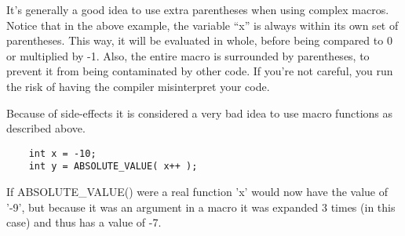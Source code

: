 It's generally a good idea to use extra parentheses when using complex macros. Notice that in the above example, the variable ``x'' is always within its own set of parentheses. This way, it will be evaluated in whole, before being compared to 0 or multiplied by -1. Also, the entire macro is surrounded by parentheses, to prevent it from being contaminated by other code. If you're not careful, you run the risk of having the compiler misinterpret your code.

Because of side-effects it is considered a very bad idea to use macro functions as described above.

\begin{verbatim}
	int x = -10;
	int y = ABSOLUTE_VALUE( x++ );
\end{verbatim}

If ABSOLUTE\_VALUE() were a real function 'x' would now have the value of '-9', but because it was an argument in a macro it was expanded 3 times (in this case) and thus has a value of -7.
